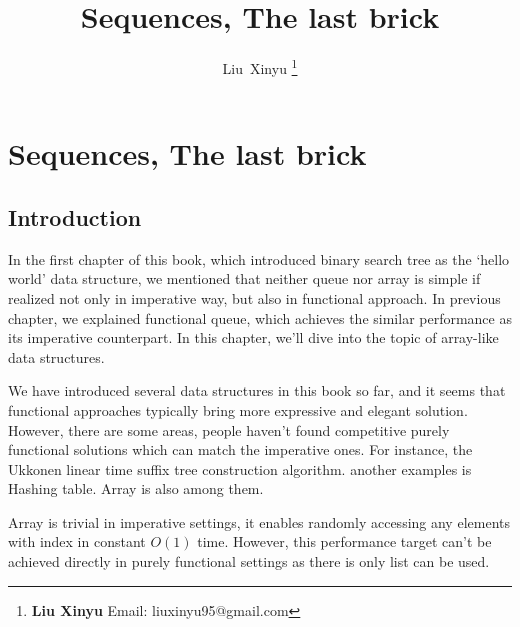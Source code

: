 \documentclass{article}
\begin{document}
\fi


\title{Sequences, The last brick}

\author{Liu~Xinyu
\thanks{{\bfseries Liu Xinyu } \newline
  Email: liuxinyu95@gmail.com \newline}
  }


\maketitle

\ifx\wholebook\relax
\chapter{Sequences, The last brick}
\fi

\section{Introduction}
\label{introduction}
In the first chapter of this book, which introduced binary search tree
as the `hello world' data structure, we mentioned that neither queue
nor array is simple if realized not only in imperative way, but also
in functional approach. In previous chapter, we explained functional
queue, which achieves the similar performance as its imperative counterpart.
In this chapter, we'll dive into the topic of array-like data structures.

We have introduced several data structures in this book so far, and 
it seems that functional approaches typically bring more expressive
and elegant solution. However, there are some areas, people haven't
found competitive purely functional solutions which can match the imperative
ones. For instance, the Ukkonen linear time suffix tree construction
algorithm. another examples is Hashing table. Array is also among them.

Array is trivial in imperative settings, it enables randomly accessing
any elements with index in constant $O(1)$ time. However, this performance
target can't be achieved directly in purely functional settings as
there is only list can be used.
\end{document}
